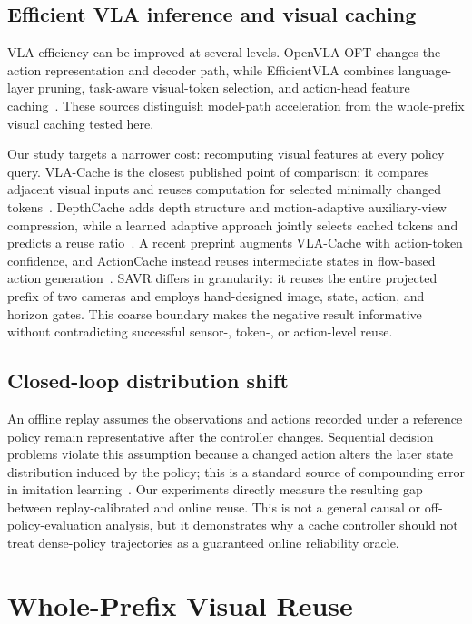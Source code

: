 \documentclass[11pt]{article}
\begin{document}
\subsection{Efficient VLA inference and visual caching}

VLA efficiency can be improved at several levels. OpenVLA-OFT changes the action representation and decoder path, while EfficientVLA combines language-layer pruning, task-aware visual-token selection, and action-head feature caching~\cite{openvlaoft,efficientvla}. These sources distinguish model-path acceleration from the whole-prefix visual caching tested here.

Our study targets a narrower cost: recomputing visual features at every policy query. VLA-Cache is the closest published point of comparison; it compares adjacent visual inputs and reuses computation for selected minimally changed tokens~\cite{vlacache}. DepthCache adds depth structure and motion-adaptive auxiliary-view compression, while a learned adaptive approach jointly selects cached tokens and predicts a reuse ratio~\cite{depthcache,learnedcache}. A recent preprint augments VLA-Cache with action-token confidence, and ActionCache instead reuses intermediate states in flow-based action generation~\cite{gatedcache,actioncache}. SAVR differs in granularity: it reuses the entire projected prefix of two cameras and employs hand-designed image, state, action, and horizon gates. This coarse boundary makes the negative result informative without contradicting successful sensor-, token-, or action-level reuse.

\subsection{Closed-loop distribution shift}

An offline replay assumes the observations and actions recorded under a reference policy remain representative after the controller changes. Sequential decision problems violate this assumption because a changed action alters the later state distribution induced by the policy; this is a standard source of compounding error in imitation learning~\cite{dagger}. Our experiments directly measure the resulting gap between replay-calibrated and online reuse. This is not a general causal or off-policy-evaluation analysis, but it demonstrates why a cache controller should not treat dense-policy trajectories as a guaranteed online reliability oracle.

\section{Whole-Prefix Visual Reuse}
\end{document}
